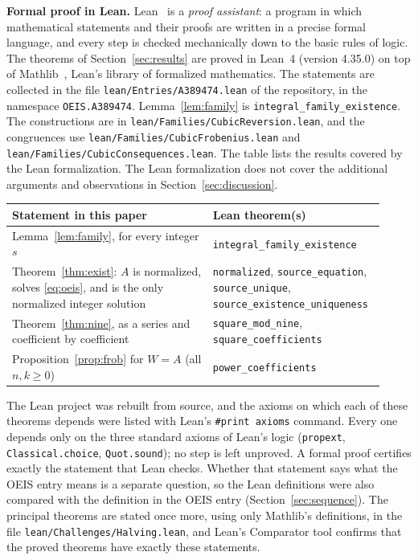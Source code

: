 \documentclass[11pt,a4paper]{article}
\theoremstyle{definition}
\theoremstyle{remark}
\newcommand{\para}[1]{\par\medskip\noindent\textbf{#1}\enspace}
\begin{document}
\para{Formal proof in Lean.}
Lean~\cite{lean} is a \emph{proof assistant}: a program in which mathematical statements and their proofs are written
in a precise formal language, and every step is checked mechanically down to the basic rules of logic. The theorems of Section~\ref{sec:results} are proved in Lean~4 (version 4.35.0) on top of
Mathlib~\cite{mathlib}, Lean's library of formalized mathematics. The statements are collected in the file \texttt{lean/Entries/A389474.lean} of the repository,
in the namespace \texttt{OEIS.A389474}. Lemma~\ref{lem:family} is \texttt{integral\_family\_existence}. The constructions are in \texttt{lean/Families/CubicReversion.lean}, and the congruences use \texttt{lean/Families/CubicFrobenius.lean} and \texttt{lean/Families/CubicConsequences.lean}.
The table lists the results covered by the Lean formalization. The Lean formalization does not cover the additional arguments and observations in Section~\ref{sec:discussion}.
\begin{center}\small\renewcommand{\arraystretch}{1.25}
\begin{tabular}{>{\raggedright\arraybackslash}p{0.52\linewidth}>{\raggedright\arraybackslash}p{0.4\linewidth}}
\toprule
Statement in this paper & Lean theorem(s)\\
\midrule
Lemma~\ref{lem:family}, for every integer $s$ & \texttt{integral\_\allowbreak{}family\_\allowbreak{}existence} \\
Theorem~\ref{thm:exist}: $A$ is normalized, solves \eqref{eq:oeis}, and is the only normalized integer solution & \texttt{normalized}, \texttt{source\_\allowbreak{}equation}, \texttt{source\_\allowbreak{}unique}, \texttt{source\_\allowbreak{}existence\_\allowbreak{}uniqueness} \\
Theorem~\ref{thm:nine}, as a series and coefficient by coefficient & \texttt{square\_\allowbreak{}mod\_\allowbreak{}nine}, \texttt{square\_\allowbreak{}coefficients} \\
Proposition~\ref{prop:frob} for $W=A$ (all $n,k\ge0$) & \texttt{power\_\allowbreak{}coefficients} \\
\bottomrule
\end{tabular}
\end{center}
The Lean project was rebuilt from source, and the axioms on which each of these theorems depends were listed with
Lean's \texttt{\#print axioms} command. Every one depends only on the three standard axioms of Lean's logic
(\texttt{propext}, \texttt{Classical.choice}, \texttt{Quot.sound}); no step is left unproved. A formal proof certifies
exactly the statement that Lean checks. Whether that statement says what the OEIS entry means is a separate question,
so the Lean definitions were also compared with the definition in the OEIS entry
(Section~\ref{sec:sequence}). The principal theorems are stated once more, using only Mathlib's definitions, in the
file \texttt{lean/Challenges/Halving.lean}, and Lean's Comparator tool confirms that the
proved theorems have exactly these statements.
\end{document}

